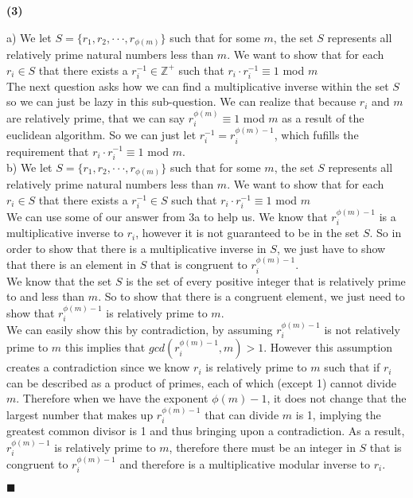\documentclass[20pt]{article}
\begin{document}
\noindent
\textbf{(3)}\\
\begin{text}
    a) We let $S = \{r_1, r_2, \cdot \cdot \cdot , r_{\phi(m)}\}$ such that for some $m$, the set $S$ represents all relatively prime natural numbers less than $m$. We want to show that for each $r_i \in S$ that there exists a $r_i^{-1} \in \mathbb{Z}^+$ such that $r_i \cdot r_i^{-1} \equiv 1$ mod $m$\\
    
    \noindent
    The next question asks how we can find a multiplicative inverse within the set $S$ so we can just be lazy in this sub-question. We can realize that because $r_i$ and $m$ are relatively prime, that we can say $r_i^{\phi(m)} \equiv 1$ mod $m$ as a result of the euclidean algorithm. So we can just let $r_i^{-1} = r_i^{\phi(m) - 1}$, which fufills the requirement that $r_i \cdot r_i^{-1} \equiv 1$ mod $m$.\\
    
    \noindent
    b) We let $S = \{r_1, r_2, \cdot \cdot \cdot , r_{\phi(m)}\}$ such that for some $m$, the set $S$ represents all relatively prime natural numbers less than $m$. We want to show that for each $r_i \in S$ that there exists a $r_i^{-1} \in S$ such that $r_i \cdot r_i^{-1} \equiv 1$ mod $m$\\
    
    \noindent
    We can use some of our answer from 3a to help us. We know that $r_i^{\phi(m) - 1}$ is a multiplicative inverse to $r_i$, however it is not guaranteed to be in the set $S$. So in order to show that there is a multiplicative inverse in $S$, we just have to show that there is an element in $S$ that is congruent to $r_i^{\phi(m) - 1}$.\\
    
    \noindent
    We know that the set $S$ is the set of every positive integer that is relatively prime to and less than $m$. So to show that there is a congruent element, we just need to show that $r_i^{\phi(m) - 1}$ is relatively prime to $m$.\\
    
    \noindent
    We can easily show this by contradiction, by assuming $r_i^{\phi(m) - 1}$ is not relatively prime to $m$ this implies that $gcd(r_i^{\phi(m) - 1}, m) > 1$. However this assumption creates a contradiction since we know $r_i$ is relatively prime to $m$ such that if $r_i$ can be described as a product of primes, each of which (except 1) cannot divide $m$. Therefore when we have the exponent $\phi(m) - 1$, it does not change that the largest number that makes up $r_i^{\phi(m) - 1}$ that can divide $m$ is 1, implying the greatest common divisor is 1 and thus bringing upon a contradiction. As a result, $r_i^{\phi(m) - 1}$ is relatively prime to $m$, therefore there must be an integer in $S$ that is congruent to $r_i^{\phi(m) - 1}$ and therefore is a multiplicative modular inverse to $r_i$.
    
    \hfill $\blacksquare$
\end{text}\\
\end{document}
